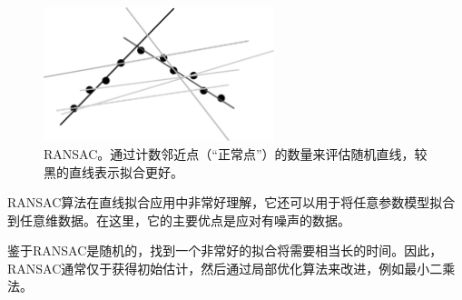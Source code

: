 \begin{figure}
\center
\includegraphics[width=0.6\textwidth]{figs/ransac}
\caption{
RANSAC。通过计数邻近点（“正常点”）的数量来评估随机直线，较黑的直线表示拟合更好。
\label{fig:ransac}}
\end{figure}



RANSAC算法在直线拟合应用中非常好理解，它还可以用于将任意参数模型拟合到任意维数据。在这里，它的主要优点是应对有噪声的数据。

鉴于RANSAC是随机的，找到一个非常好的拟合将需要相当长的时间。因此，RANSAC通常仅于获得初始估计，然后通过局部优化算法来改进，例如最小二乘法。



